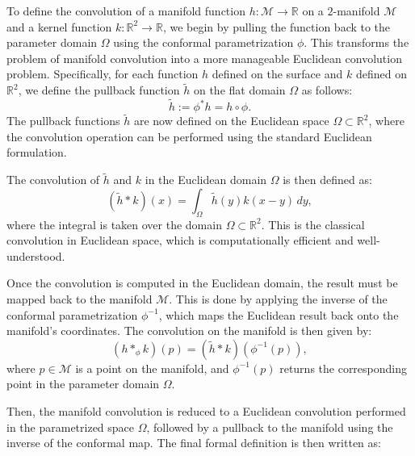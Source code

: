 To define the convolution of a manifold function $h : \mathcal{M} \to \mathbb{R}$ on a $2$-manifold $\mathcal{M}$ and a kernel function $k : \mathbb{R}^2 \to \mathbb{R}$, we begin by pulling the function back to the parameter domain $\Omega$ using the conformal parametrization $\phi$. This transforms the problem of manifold convolution into a more manageable Euclidean convolution problem. Specifically, for each function $h$ defined on the surface and $k$ defined on $\mathbb{R}^2$, we define the pullback function $\tilde{h}$ on the flat domain $\Omega$ as follows:
\begin{equation}
\tilde{h}:=\phi^* h = h \circ \phi.
\end{equation}
The pullback functions $\tilde{h}$ are now defined on the Euclidean space $\Omega \subset \mathbb{R}^2$, where the convolution operation can be performed using the standard Euclidean formulation.

The convolution of $\tilde{h}$ and $k$ in the Euclidean domain $\Omega$ is then defined as:
\begin{equation}
(\tilde{h} \ast k)(x) = \int_{\Omega} \tilde{h}(y) k(x - y) \, dy,
\end{equation}
where the integral is taken over the domain $\Omega \subset \mathbb{R}^2$. This is the classical convolution in Euclidean space, which is computationally efficient and well-understood.

Once the convolution is computed in the Euclidean domain, the result must be mapped back to the manifold $\mathcal{M}$. This is done by applying the inverse of the conformal parametrization $\phi^{-1}$, which maps the Euclidean result back onto the manifold's coordinates. The convolution on the manifold is then given by:
\begin{equation}
(h \ast_\phi k)(p) = (\tilde{h} \ast k)(\phi^{-1}(p)),
\end{equation}
where $p \in \mathcal{M}$ is a point on the manifold, and $\phi^{-1}(p)$ returns the corresponding point in the parameter domain $\Omega$.

Then, the manifold convolution is reduced to a Euclidean convolution performed in the parametrized space $\Omega$, followed by a pullback to the manifold using the inverse of the conformal map. The final formal definition is then written as:

